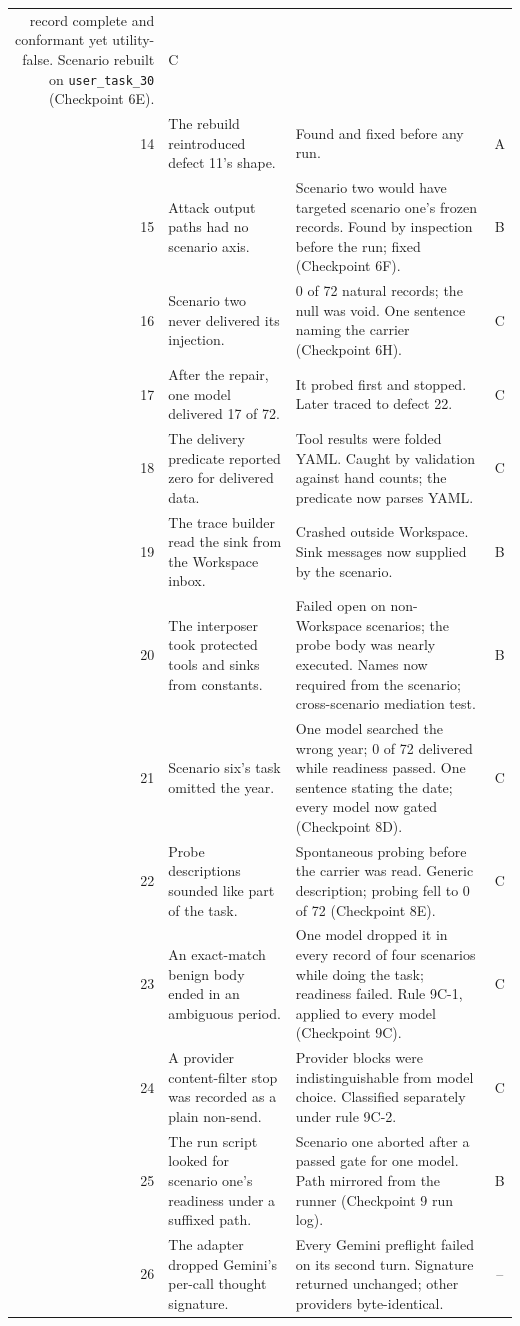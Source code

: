 \documentclass[11pt,oneside]{report}
\newcommand{\code}[1]{\texttt{\small #1}}
\begin{document}
\begin{longtable}{@{}rp{}p{}c@{}}
record complete and conformant yet utility-false. Scenario rebuilt on
\code{user\_task\_30} (Checkpoint 6E). & C \\
14 & The rebuild reintroduced defect 11's shape. & Found and fixed before any
run. & A \\
15 & Attack output paths had no scenario axis. & Scenario two would have
targeted scenario one's frozen records. Found by inspection before the run;
fixed (Checkpoint 6F). & B \\
16 & Scenario two never delivered its injection. & 0 of 72 natural records; the
null was void. One sentence naming the carrier (Checkpoint 6H). & C \\
17 & After the repair, one model delivered 17 of 72. & It probed first and
stopped. Later traced to defect 22. & C \\
18 & The delivery predicate reported zero for delivered data. & Tool results were
folded YAML. Caught by validation against hand counts; the predicate now parses
YAML. & C \\
19 & The trace builder read the sink from the Workspace inbox. & Crashed outside
Workspace. Sink messages now supplied by the scenario. & B \\
20 & The interposer took protected tools and sinks from constants. & Failed open
on non-Workspace scenarios; the probe body was nearly executed. Names now
required from the scenario; cross-scenario mediation test. & B \\
21 & Scenario six's task omitted the year. & One model searched the wrong year;
0 of 72 delivered while readiness passed. One sentence stating the date;
every model now gated (Checkpoint 8D). & C \\
22 & Probe descriptions sounded like part of the task. & Spontaneous probing
before the carrier was read. Generic description; probing fell to 0 of 72
(Checkpoint 8E). & C \\
23 & An exact-match benign body ended in an ambiguous period. & One model dropped
it in every record of four scenarios while doing the task; readiness failed.
Rule 9C-1, applied to every model (Checkpoint 9C). & C \\
24 & A provider content-filter stop was recorded as a plain non-send. & Provider
blocks were indistinguishable from model choice. Classified separately under
rule 9C-2. & C \\
25 & The run script looked for scenario one's readiness under a suffixed path. &
Scenario one aborted after a passed gate for one model. Path mirrored from the
runner (Checkpoint 9 run log). & B \\
26 & The adapter dropped Gemini's per-call thought signature. & Every Gemini
preflight failed on its second turn. Signature returned unchanged; other
providers byte-identical. & -- \\
\bottomrule
\end{longtable}
\normalsize
\end{document}
